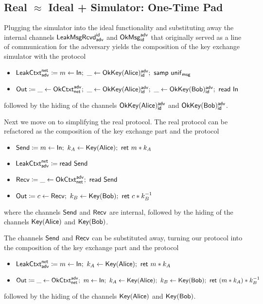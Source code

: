 \subsection{Real \texorpdfstring{$\approx$}{Approximates} Ideal + Simulator: One-Time Pad}
Plugging the simulator into the ideal functionality and substituting away the internal channels $\mathsf{LeakMsgRcvd}^{\mathsf{id}}_{\mathsf{adv}}$ and $\mathsf{OkMsg}^{\mathsf{adv}}_{\mathsf{id}}$ that originally served as a line of communication for the adversary yields the composition of the key exchange simulator with the protocol
\begin{itemize}
\item $\LeakCtxt^\net_\adv \coloneqq m \leftarrow \In; \ \_ \leftarrow \OkKey(\Alice)^\adv_\id; \ \samp{\unif_\msg}$
\item $\mathsf{Out} \coloneqq \_ \leftarrow \mathsf{OkCtxt}^{\mathsf{adv}}_{\mathsf{net}}; \ \_ \leftarrow \mathsf{OkKey}(\mathsf{Alice})^{\mathsf{adv}}_{\mathsf{id}}; \ \_ \leftarrow \mathsf{OkKey}(\mathsf{Bob})^{\mathsf{adv}}_{\mathsf{id}}; \  \mathsf{read} \ \mathsf{In}$
\end{itemize}
followed by the hiding of the channels $\mathsf{OkKey}(\mathsf{Alice})^{\mathsf{adv}}_{\mathsf{id}}$ and $\mathsf{OkKey}(\mathsf{Bob})^{\mathsf{adv}}_{\mathsf{id}}$.

Next we move on to simplifying the real protocol. The real protocol can be refactored as the composition of the key exchange part and the protocol
\begin{itemize}
\item $\Send \coloneqq m \leftarrow \In; \ k_A \leftarrow \Key(\Alice); \ \ret{m * k_A}$
\item $\mathsf{LeakCtxt}^{\mathsf{net}}_{\mathsf{adv}} \coloneqq \mathsf{read} \ \mathsf{Send}$
\item $\mathsf{Recv} \coloneqq \_ \leftarrow \mathsf{OkCtxt}^{\mathsf{adv}}_{\mathsf{net}}; \ \mathsf{read} \ \mathsf{Send}$
\item $\Out \coloneqq c \leftarrow \Recv; \ k_B \leftarrow \Key(\Bob); \ \ret{c * k_B^{-1}}$
\end{itemize}
\noindent where the channels $\mathsf{Send}$ and $\mathsf{Recv}$ are internal, followed by the hiding of the channels $\mathsf{Key}(\mathsf{Alice})$ and $\mathsf{Key}(\mathsf{Bob})$.

The channels $\mathsf{Send}$ and $\mathsf{Recv}$ can be substituted away, turning our protocol into the composition of the key exchange part and the protocol
\begin{itemize}
\item $\mathsf{LeakCtxt}^{\mathsf{net}}_{\mathsf{adv}} \coloneqq m \leftarrow \mathsf{In}; \ k_A \leftarrow \mathsf{Key}(\mathsf{Alice}); \ \mathsf{ret} \ m * k_A$
\item $\Out \coloneqq \_ \leftarrow \OkCtxt^\adv_\net; \ m \leftarrow \In; \ k_A \leftarrow \Key(\Alice); \ k_B \leftarrow \Key(\Bob); \ \ret{(m * k_A) * k_B^{-1}}$
\end{itemize}
followed by the hiding of the channels $\mathsf{Key}(\mathsf{Alice})$ and $\mathsf{Key}(\mathsf{Bob})$.


